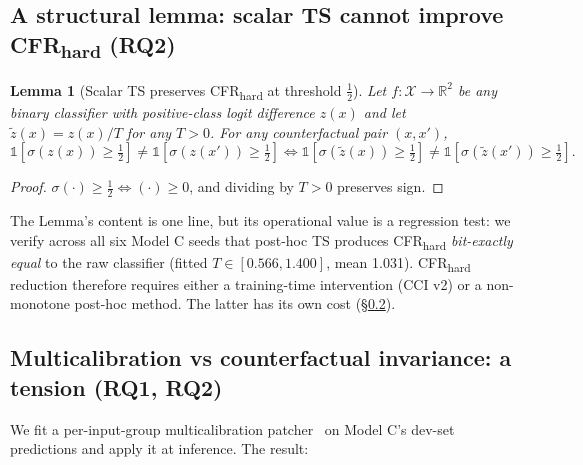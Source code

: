 \documentclass[10pt,a4paper]{article}
\newtheorem{lemma}{Lemma}
\begin{document}
\subsection{A structural lemma: scalar TS cannot improve CFR\textsubscript{hard} (RQ2)}
\label{sec:lemma}

\begin{lemma}[Scalar TS preserves CFR\textsubscript{hard} at threshold $\tfrac{1}{2}$]
\label{lem:ts-cfr}
Let $f:\mathcal{X}\to\mathbb{R}^2$ be any binary classifier with positive-class
logit difference $z(x)$ and let $\tilde z(x){=}z(x)/T$ for any $T{>}0$. For any
counterfactual pair $(x, x')$,
\[
\mathbb{1}[\sigma(z(x))\geq\tfrac{1}{2}]\neq\mathbb{1}[\sigma(z(x'))\geq\tfrac{1}{2}]
\iff
\mathbb{1}[\sigma(\tilde z(x))\geq\tfrac{1}{2}]\neq\mathbb{1}[\sigma(\tilde z(x'))\geq\tfrac{1}{2}].
\]
\end{lemma}

\begin{proof}
$\sigma(\cdot)\geq\tfrac{1}{2}\iff(\cdot)\geq 0$, and dividing by $T{>}0$ preserves sign.
\end{proof}

The Lemma's content is one line, but its operational value is a regression test:
we verify across all six Model C seeds that post-hoc TS produces CFR\textsubscript{hard}
\emph{bit-exactly equal} to the raw classifier (fitted $T\in[0.566, 1.400]$,
mean 1.031). CFR\textsubscript{hard} reduction therefore requires either a
training-time intervention (CCI v2) or a non-monotone post-hoc method.
The latter has its own cost (\S\ref{sec:tension}).

\subsection{Multicalibration vs counterfactual invariance: a tension (RQ1, RQ2)}
\label{sec:tension}

We fit a per-input-group multicalibration patcher~\citep{hebertjohnson2018multicalibration}
on Model C's dev-set predictions and apply it at inference. The result:
\end{document}
